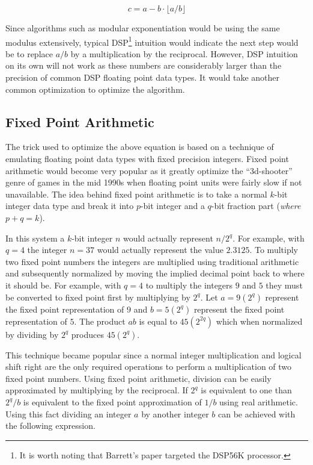 \documentclass[b5paper]{book}
\begin{document}
\begin{equation}
c = a - b \cdot \lfloor a/b \rfloor
\end{equation}

Since algorithms such as modular exponentiation would be using the same modulus extensively, typical DSP\footnote{It is worth noting that Barrett's paper 
targeted the DSP56K processor.}  intuition would indicate the next step would be to replace $a/b$ by a multiplication by the reciprocal.  However, 
DSP intuition on its own will not work as these numbers are considerably larger than the precision of common DSP floating point data types.  
It would take another common optimization to optimize the algorithm.

\subsection{Fixed Point Arithmetic}
The trick used to optimize the above equation is based on a technique of emulating floating point data types with fixed precision integers.  Fixed
point arithmetic would become very popular as it greatly optimize the ``3d-shooter'' genre of games in the mid 1990s when floating point units were 
fairly slow if not unavailable.   The idea behind fixed point arithmetic is to take a normal $k$-bit integer data type and break it into $p$-bit 
integer and a $q$-bit fraction part (\textit{where $p+q = k$}).  

In this system a $k$-bit integer $n$ would actually represent $n/2^q$.  For example, with $q = 4$ the integer $n = 37$ would actually represent the
value $2.3125$.  To multiply two fixed point numbers the integers are multiplied using traditional arithmetic and subsequently normalized by 
moving the implied decimal point back to where it should be.  For example, with $q = 4$ to multiply the integers $9$ and $5$ they must be converted 
to fixed point first by multiplying by $2^q$.  Let $a = 9(2^q)$ represent the fixed point representation of $9$ and $b = 5(2^q)$ represent the 
fixed point representation of $5$.  The product $ab$ is equal to $45(2^{2q})$ which when normalized by dividing by $2^q$ produces $45(2^q)$.  

This technique became popular since a normal integer multiplication and logical shift right are the only required operations to perform a multiplication
of two fixed point numbers.  Using fixed point arithmetic, division can be easily approximated by multiplying by the reciprocal.  If $2^q$ is 
equivalent to one than $2^q/b$ is equivalent to the fixed point approximation of $1/b$ using real arithmetic.  Using this fact dividing an integer 
$a$ by another integer $b$ can be achieved with the following expression.
\end{document}
